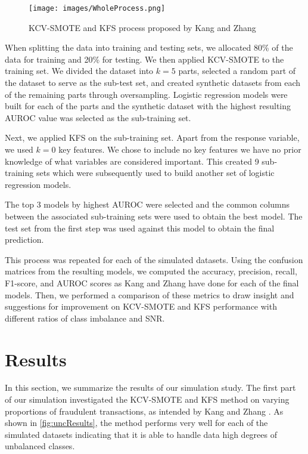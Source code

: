 \documentclass[a4paper, 12pt]{article}
\begin{document}
\begin{figure}[h]
\begin{center}
\texttt{[image: images/WholeProcess.png]}
\caption{KCV-SMOTE and KFS process proposed by Kang and Zhang \cite{kcvSmoteStudy}}
\label{fig:kcvsmotekfs}
\end{center}
\end{figure}

When splitting the data into training and testing sets, we allocated 80\% of the data for training and 20\% for testing. We then applied KCV-SMOTE to the training set. We divided the dataset into $k=5$ parts, selected a random part of the dataset to serve as the sub-test set, and created synthetic datasets from each of the remaining parts through oversampling. Logistic regression models were built for each of the parts and the synthetic dataset with the highest resulting AUROC value was selected as the sub-training set.

Next, we applied KFS on the sub-training set. Apart from the response variable, we used $k=0$ key features. We chose to include no key features we have no prior knowledge of what variables are considered important. This created 9 sub-training sets which were subsequently used to build another set of logistic regression models.

The top 3 models by highest AUROC were selected and the common columns between the associated sub-training sets were used to obtain the best model. The test set from the first step was used against this model to obtain the final prediction.

This process was repeated for each of the simulated datasets. Using the confusion matrices from the resulting models, we computed the accuracy, precision, recall, F1-score, and AUROC scores as Kang and Zhang \cite{kcvSmoteStudy} have done for each of the final models. Then, we performed a comparison of these metrics to draw insight and suggestions for improvement on KCV-SMOTE and KFS performance with different ratios of class imbalance and SNR. 

\section{Results}

In this section, we summarize the results of our simulation study. The first part of our simulation investigated the KCV-SMOTE and KFS method on varying proportions of fraudulent transactions, as intended by Kang and Zhang \cite{kcvSmoteStudy}. As shown in \ref{fig:uncResults}, the method performs very well for each of the simulated datasets indicating that it is able to handle data high degrees of unbalanced classes.
\end{document}
